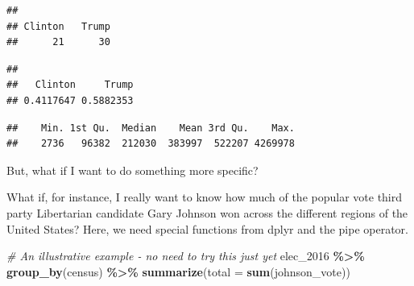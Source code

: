 \documentclass[
]{book}
\newenvironment{Shaded}{\begin{snugshade}}{\end{snugshade}}
\newcommand{\AttributeTok}[1]{\textcolor[rgb]{0.13,0.29,0.53}{#1}}
\newcommand{\CommentTok}[1]{\textcolor[rgb]{0.56,0.35,0.01}{\textit{#1}}}
\newcommand{\FunctionTok}[1]{\textcolor[rgb]{0.13,0.29,0.53}{\textbf{#1}}}
\newcommand{\NormalTok}[1]{#1}
\newcommand{\SpecialCharTok}[1]{\textcolor[rgb]{0.81,0.36,0.00}{\textbf{#1}}}
\begin{document}
\begin{verbatim}
## 
## Clinton   Trump 
##      21      30
\end{verbatim}

\begin{Shaded}
\end{Shaded}

\begin{verbatim}
## 
##   Clinton     Trump 
## 0.4117647 0.5882353
\end{verbatim}

\begin{Shaded}
\end{Shaded}

\begin{verbatim}
##    Min. 1st Qu.  Median    Mean 3rd Qu.    Max. 
##    2736   96382  212030  383997  522207 4269978
\end{verbatim}

But, what if I want to do something more specific?

What if, for instance, I really want to know how much of the popular vote third party Libertarian candidate Gary Johnson won across the different regions of the United States? Here, we need special functions from dplyr and the pipe operator.

\begin{Shaded}
\begin{Highlighting}[]
\CommentTok{\# An illustrative example {-} no need to try this just yet}
\NormalTok{elec\_2016 }\SpecialCharTok{\%\textgreater{}\%}
  \FunctionTok{group\_by}\NormalTok{(census) }\SpecialCharTok{\%\textgreater{}\%}
  \FunctionTok{summarize}\NormalTok{(}\AttributeTok{total =} \FunctionTok{sum}\NormalTok{(johnson\_vote))}
\end{Highlighting}
\end{Shaded}
\end{document}
